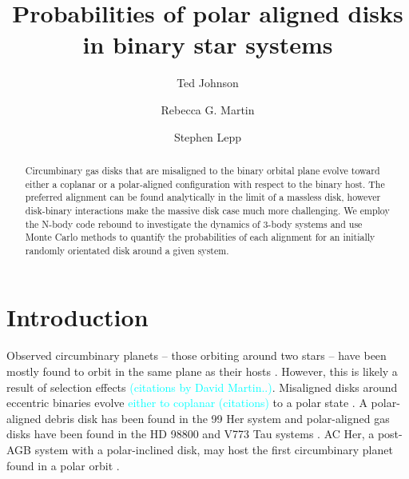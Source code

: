 \documentclass[twocolumn]{aastex631}
\newcommand{\RGM}[1]{\textcolor{cyan}{#1}}
\begin{document}
\title{Probabilities of polar aligned disks in binary star systems}

\author{Ted Johnson}
\author{Rebecca G. Martin}
\author{Stephen Lepp}

\begin{abstract}
    Circumbinary gas disks that are misaligned to the binary orbital plane evolve toward either a coplanar or a polar-aligned configuration with respect to the binary host.
    The preferred alignment can be found analytically
    in the limit of a massless disk, however disk-binary interactions make the massive disk case much more challenging.
    We employ the N-body code {\sc rebound} to investigate the dynamics of  3-body systems and use Monte Carlo methods
    to quantify the probabilities of each alignment for an initially randomly orientated disk around a given system.
\end{abstract}

\section{Introduction}
\label{sec:intro}



Observed circumbinary planets -- those orbiting around two stars -- have been mostly found to orbit in the same plane as
their hosts \citep{doyle2011,orosz2012,welsh2012}. However, this is likely a result of selection effects \RGM{(citations by David Martin..)}.  Misaligned disks around eccentric binaries evolve \RGM{either to coplanar (citations)} to a polar state  \citep{aly2015,martin2017}. A polar-aligned debris disk has been found in the 99 Her system
\citep{kennedy2012} and polar-aligned gas disks have been found in the HD 98800 \citep{kennedy2019} and V773 Tau systems \citep{kenworthy2022}.
AC Her, a post-AGB system with a polar-inclined
disk, may host the first circumbinary planet found in a polar orbit \citep{hillen2015,anugu2023,martin2023}.
\end{document}
